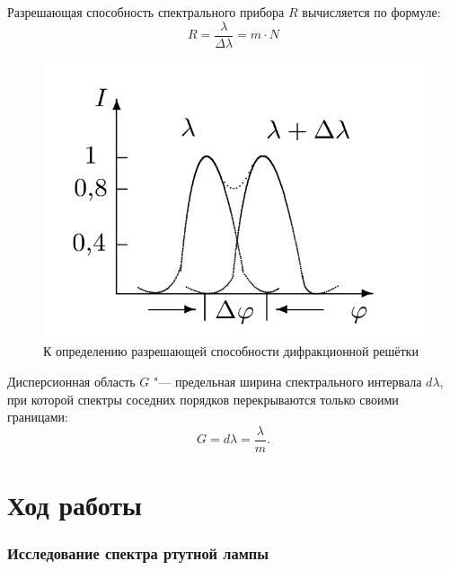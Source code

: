 \documentclass[a4paper,12pt]{article}
\begin{document}
 
 Разрешающая способность спектрального прибора $R$ вычисляется по формуле:
 \[
 R = \frac{\lambda}{\Delta \lambda} = m \cdot N
 \]
 
\begin{figure}[h]
	\begin{center}
   		\includegraphics[scale = 0.7]{fig2}
    		\caption{К определению разрешающей способности дифракционной
    		решётки}
		\end{center}
\end{figure}

Дисперсионная область $G$ "--- предельная ширина спектрального интервала $d \lambda$, при которой спектры соседних порядков перекрываются только своими границами:
\[
G = d \lambda = \frac{\lambda}{m}.
\]
 

\section*{Ход работы}
 
\subsubsection*{Исследование спектра ртутной лампы}
\end{document}
